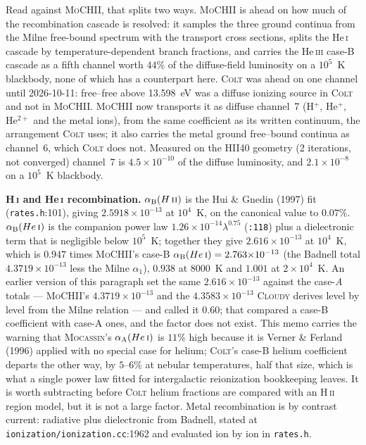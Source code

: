 \documentclass[english,a4paper]{my_memo}
\newcommand{\code}[1]{\texttt{#1}}
\newcommand{\MoCHII}{\textsc{MoCHII}}
\newcommand{\Mocassin}{\textsc{Mocassin}}
\newcommand{\Cloudy}{\textsc{Cloudy}}
\newcommand{\Colt}{\textsc{Colt}}
\newcommand{\HII}{H\,\textsc{ii}}
\newcommand{\HI}{H\,\textsc{i}}
\newcommand{\HeI}{He\,\textsc{i}}
\newcommand{\HeIII}{He\,\textsc{iii}}
\begin{document}
Read against \MoCHII{}, that splits two ways.  \MoCHII{} is ahead on how
much of the recombination cascade is resolved: it samples the three ground
continua from the Milne free-bound spectrum with the transport cross
sections, splits the \HeI{} cascade by temperature-dependent branch
fractions, and carries the \HeIII{} case-B cascade as a fifth channel
worth $44\%$ of the diffuse-field luminosity on a $10^5$~K blackbody, none
of which has a counterpart here.  \Colt{} was ahead on one channel until
2026-10-11: free--free above 13.598~eV was a diffuse ionizing source in
\Colt{} and not in \MoCHII{}.  \MoCHII{} now transports it as diffuse
channel~7 (H$^+$, He$^+$, He$^{2+}$ and the metal ions), from the same
coefficient as its written continuum, the arrangement \Colt{} uses; it also
carries the metal ground free--bound continua as channel~6, which \Colt{}
does not.  Measured on the HII40 geometry (2 iterations, not converged)
channel~7 is $4.5\times10^{-10}$ of the diffuse luminosity, and
$2.1\times10^{-8}$ on a $10^5$~K blackbody.

\textbf{\HI{} and \HeI{} recombination.}  $\alpha_{\rm B}(\HII{})$ is the
Hui \& Gnedin (1997) fit (\code{rates.h}:101), giving
$2.5918{\times}10^{-13}$ at $10^4$~K, on the canonical value to $0.07\%$.
$\alpha_{\rm B}(\HeI{})$ is the companion power law
$1.26{\times}10^{-14}\lambda^{0.75}$ (\code{:118}) plus a dielectronic term
that is negligible below $10^5$~K; together they give
$2.616{\times}10^{-13}$ at $10^4$~K, which is $\mathbf{0.947}$ times
\MoCHII{}'s case-B $\alpha_{\rm B}(\HeI{}) = 2.763{\times}10^{-13}$ (the
Badnell total $4.3719{\times}10^{-13}$ less the Milne $\alpha_1$), $0.938$ at
8000~K and $1.001$ at $2{\times}10^4$~K.  An earlier version of this paragraph
set the same $2.616{\times}10^{-13}$ against the case-\emph{A} totals ---
\MoCHII{}'s $4.3719{\times}10^{-13}$ and the $4.3583{\times}10^{-13}$
\Cloudy{} derives level by level from the Milne relation --- and called it
$0.60$; that compared a case-B coefficient with case-A ones, and the factor
does not exist.  This memo carries the warning that \Mocassin{}'s
$\alpha_{\rm A}(\HeI{})$ is $11\%$ high because it is Verner \& Ferland
(1996) applied with no special case for helium; \Colt{}'s case-B helium
coefficient departs the other way, by $5$--$6\%$ at nebular temperatures, half
that size, which is what a single power law fitted for intergalactic
reionization bookkeeping leaves.  It is worth subtracting before \Colt{}
helium fractions are compared with an \HII{} region model, but it is not a
large factor.  Metal recombination is by contrast
current: radiative plus dielectronic from Badnell, stated at
\code{ionization/\allowbreak ionization.cc}:1962 and evaluated ion by ion in
\code{rates.h}.
\end{document}
